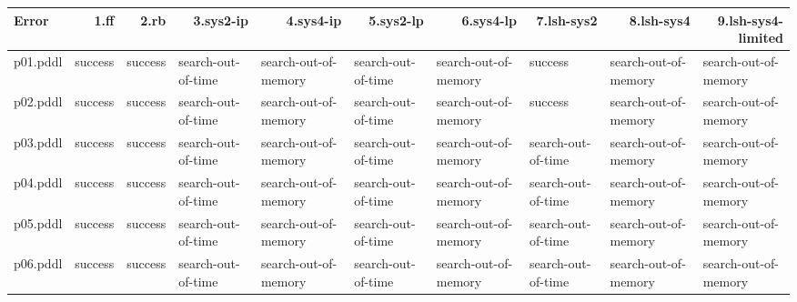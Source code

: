 \documentclass{article}
\begin{document}
\begin{tabular}{@{}lrrrrrrrrr@{}}
Error & 1.ff & 2.rb & 3.sys2-ip & 4.sys4-ip & 5.sys2-lp & 6.sys4-lp & 7.lsh-sys2 & 8.lsh-sys4 & 9.lsh-sys4-limited \\
\midrule
p01.pddl & \multicolumn{1}{|l|}{success} & \multicolumn{1}{|l|}{success} & \multicolumn{1}{|l|}{search-out-of-time} & \multicolumn{1}{|l|}{search-out-of-memory} & \multicolumn{1}{|l|}{search-out-of-time} & \multicolumn{1}{|l|}{search-out-of-memory} & \multicolumn{1}{|l|}{success} & \multicolumn{1}{|l|}{search-out-of-memory} & \multicolumn{1}{|l|}{search-out-of-memory} \\
p02.pddl & \multicolumn{1}{|l|}{success} & \multicolumn{1}{|l|}{success} & \multicolumn{1}{|l|}{search-out-of-time} & \multicolumn{1}{|l|}{search-out-of-memory} & \multicolumn{1}{|l|}{search-out-of-time} & \multicolumn{1}{|l|}{search-out-of-memory} & \multicolumn{1}{|l|}{success} & \multicolumn{1}{|l|}{search-out-of-memory} & \multicolumn{1}{|l|}{search-out-of-memory} \\
p03.pddl & \multicolumn{1}{|l|}{success} & \multicolumn{1}{|l|}{success} & \multicolumn{1}{|l|}{search-out-of-time} & \multicolumn{1}{|l|}{search-out-of-memory} & \multicolumn{1}{|l|}{search-out-of-time} & \multicolumn{1}{|l|}{search-out-of-memory} & \multicolumn{1}{|l|}{search-out-of-time} & \multicolumn{1}{|l|}{search-out-of-memory} & \multicolumn{1}{|l|}{search-out-of-memory} \\
p04.pddl & \multicolumn{1}{|l|}{success} & \multicolumn{1}{|l|}{success} & \multicolumn{1}{|l|}{search-out-of-time} & \multicolumn{1}{|l|}{search-out-of-memory} & \multicolumn{1}{|l|}{search-out-of-time} & \multicolumn{1}{|l|}{search-out-of-memory} & \multicolumn{1}{|l|}{search-out-of-time} & \multicolumn{1}{|l|}{search-out-of-memory} & \multicolumn{1}{|l|}{search-out-of-memory} \\
p05.pddl & \multicolumn{1}{|l|}{success} & \multicolumn{1}{|l|}{success} & \multicolumn{1}{|l|}{search-out-of-time} & \multicolumn{1}{|l|}{search-out-of-memory} & \multicolumn{1}{|l|}{search-out-of-time} & \multicolumn{1}{|l|}{search-out-of-memory} & \multicolumn{1}{|l|}{search-out-of-time} & \multicolumn{1}{|l|}{search-out-of-memory} & \multicolumn{1}{|l|}{search-out-of-memory} \\
p06.pddl & \multicolumn{1}{|l|}{success} & \multicolumn{1}{|l|}{success} & \multicolumn{1}{|l|}{search-out-of-time} & \multicolumn{1}{|l|}{search-out-of-memory} & \multicolumn{1}{|l|}{search-out-of-time} & \multicolumn{1}{|l|}{search-out-of-memory} & \multicolumn{1}{|l|}{search-out-of-time} & \multicolumn{1}{|l|}{search-out-of-memory} & \multicolumn{1}{|l|}{search-out-of-memory} \\

\end{tabular}
\end{document}
